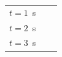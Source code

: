 {\begin{tabular}[t]{|l|l|l|}
    
        \begin{math}t=1\end{math}~s &
    
    
         &
    
    
     \tabularnewline\cline{1-1}\cline{2-2}\cline{3-3}
    
    
        \begin{math}t=2\end{math}~s &
    
    
         &
    
    
     \tabularnewline\cline{1-1}\cline{2-2}\cline{3-3}
    
    
        \begin{math}t=3\end{math}~s &
    
    
         &
    
    
     \tabularnewline\cline{1-1}\cline{2-2}\cline{3-3}
    \end{tabular}} %
